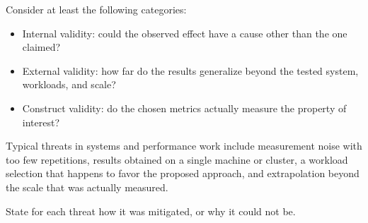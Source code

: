 Consider at least the following categories:

\begin{itemize}
  \item Internal validity: could the observed effect have a cause other than the one claimed?
  \item External validity: how far do the results generalize beyond the tested system, workloads, and scale?
  \item Construct validity: do the chosen metrics actually measure the property of interest?
\end{itemize}
Typical threats in systems and performance work include measurement noise with too few repetitions, results obtained on a single machine or cluster, a workload selection that happens to favor the proposed approach, and extrapolation beyond the scale that was actually measured.

State for each threat how it was mitigated, or why it could not be.

